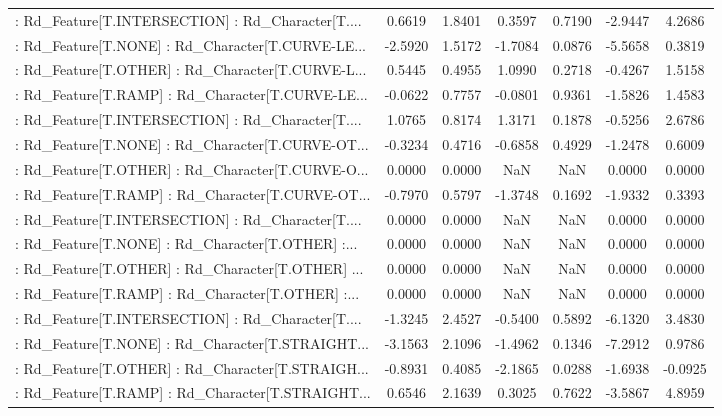 \begin{longtable}{p{4cm}cccccc}
 : Rd\_Feature[T.INTERSECTION] : Rd\_Character[T.... &  0.6619 &    1.8401 &  0.3597 &       0.7190 & -2.9447 &  4.2686 \\
 : Rd\_Feature[T.NONE] : Rd\_Character[T.CURVE-LE... & -2.5920 &    1.5172 & -1.7084 &       0.0876 & -5.5658 &  0.3819 \\
 : Rd\_Feature[T.OTHER] : Rd\_Character[T.CURVE-L... &  0.5445 &    0.4955 &  1.0990 &       0.2718 & -0.4267 &  1.5158 \\
 : Rd\_Feature[T.RAMP] : Rd\_Character[T.CURVE-LE... & -0.0622 &    0.7757 & -0.0801 &       0.9361 & -1.5826 &  1.4583 \\
 : Rd\_Feature[T.INTERSECTION] : Rd\_Character[T.... &  1.0765 &    0.8174 &  1.3171 &       0.1878 & -0.5256 &  2.6786 \\
 : Rd\_Feature[T.NONE] : Rd\_Character[T.CURVE-OT... & -0.3234 &    0.4716 & -0.6858 &       0.4929 & -1.2478 &  0.6009 \\
 : Rd\_Feature[T.OTHER] : Rd\_Character[T.CURVE-O... &  0.0000 &    0.0000 &     NaN &          NaN &  0.0000 &  0.0000 \\
 : Rd\_Feature[T.RAMP] : Rd\_Character[T.CURVE-OT... & -0.7970 &    0.5797 & -1.3748 &       0.1692 & -1.9332 &  0.3393 \\
 : Rd\_Feature[T.INTERSECTION] : Rd\_Character[T.... &  0.0000 &    0.0000 &     NaN &          NaN &  0.0000 &  0.0000 \\
 : Rd\_Feature[T.NONE] : Rd\_Character[T.OTHER] :... &  0.0000 &    0.0000 &     NaN &          NaN &  0.0000 &  0.0000 \\
 : Rd\_Feature[T.OTHER] : Rd\_Character[T.OTHER] ... &  0.0000 &    0.0000 &     NaN &          NaN &  0.0000 &  0.0000 \\
 : Rd\_Feature[T.RAMP] : Rd\_Character[T.OTHER] :... &  0.0000 &    0.0000 &     NaN &          NaN &  0.0000 &  0.0000 \\
 : Rd\_Feature[T.INTERSECTION] : Rd\_Character[T.... & -1.3245 &    2.4527 & -0.5400 &       0.5892 & -6.1320 &  3.4830 \\
 : Rd\_Feature[T.NONE] : Rd\_Character[T.STRAIGHT... & -3.1563 &    2.1096 & -1.4962 &       0.1346 & -7.2912 &  0.9786 \\
 : Rd\_Feature[T.OTHER] : Rd\_Character[T.STRAIGH... & -0.8931 &    0.4085 & -2.1865 &       0.0288 & -1.6938 & -0.0925 \\
 : Rd\_Feature[T.RAMP] : Rd\_Character[T.STRAIGHT... &  0.6546 &    2.1639 &  0.3025 &       0.7622 & -3.5867 &  4.8959 \\

\end{longtable}
